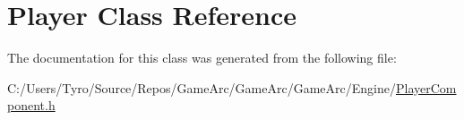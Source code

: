 \hypertarget{class_player}{}\section{Player Class Reference}
\label{class_player}


The documentation for this class was generated from the following file\+:\begin{DoxyCompactItemize}
\item 
C\+:/\+Users/\+Tyro/\+Source/\+Repos/\+Game\+Arc/\+Game\+Arc/\+Game\+Arc/\+Engine/\mbox{\hyperlink{_player_component_8h}{Player\+Component.\+h}}\end{DoxyCompactItemize}
